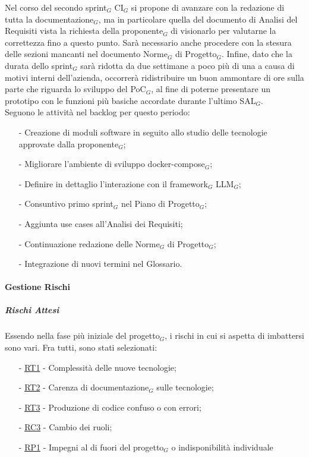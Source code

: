 \documentclass[10pt]{article}
\begin{document}
{{{    Nel corso del secondo sprint$_G$ CI$_G$ si propone di avanzare con la redazione di tutta la documentazione$_G$, ma in particolare quella del documento di Analisi del Requisiti vista la richiesta della proponente$_G$ di visionarlo per valutarne la correttezza fino a questo punto. Sarà necessario anche procedere con la stesura delle sezioni mancanti nel documento Norme$_G$ di Progetto$_G$. Infine, dato che la durata dello sprint$_G$ sarà ridotta da due settimane a poco più di una a causa di motivi interni dell'azienda, occorrerà ridistribuire un buon ammontare di ore sulla parte che riguarda lo sviluppo del PoC$_G$, al fine di poterne presentare un prototipo con le funzioni più basiche accordate durante l'ultimo SAL$_G$.\\
    Seguono le attività nel backlog per questo periodo:
    \vspace{-0.5em}
    \begin{itemize}
    \setlength\itemsep{-0.2em}
    \item [-] Creazione di moduli software in seguito allo studio delle tecnologie approvate dalla proponente$_G$;
    \item [-] Migliorare l'ambiente di sviluppo docker-compose$_G$; 
    \item [-] Definire in dettaglio l'interazione con il framework$_G$ LLM$_G$;
    \item [-] Consuntivo primo sprint$_G$ nel Piano di Progetto$_G$;
    \item [-] Aggiunta use cases all'Analisi dei Requisiti;
    \item [-] Continuazione redazione delle Norme$_G$ di Progetto$_G$;
    \item [-] Integrazione di nuovi termini nel Glossario.
    \end{itemize}

    \paragraph{Gestione Rischi}\mbox{}
    \vspace{-1em}
    \subparagraph*{Rischi Attesi}\mbox{}
    
    Essendo nella fase più iniziale del progetto$_G$, i rischi in cui si aspetta di imbattersi sono vari. Fra tutti, sono stati selezionati:
    \vspace{-0.5em}
    \begin{itemize}
    \setlength\itemsep{-0.2em}
    \item [-] \hyperref[RT1]{RT1} - Complessità delle nuove tecnologie;
    \item [-] \hyperref[RT2]{RT2} - Carenza di documentazione$_G$ sulle tecnologie;
    \item [-] \hyperref[RT3]{RT3} - Produzione di codice confuso o con errori;
    \item [-] \hyperref[RC3]{RC3} - Cambio dei ruoli;
    \item [-] \hyperref[RP1]{RP1} - Impegni al di fuori del progetto$_G$ o indisponibilità individuale
    \end{itemize}

}}}
\end{document}
